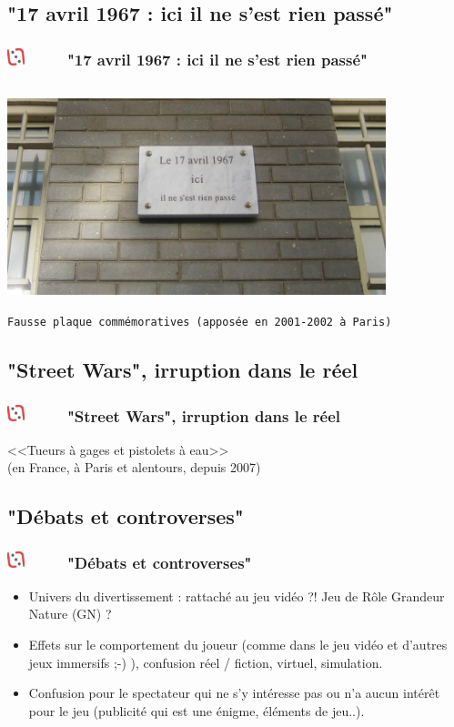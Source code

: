 \documentclass[slidetop,11pt]{beamer}
\def\moreInFrameTitleLeftt{\includegraphics[height=0.5cm]{img/ligueludique-0.png}~~~~~}
\begin{document}
\def\sectionPartIIIa{"17 avril 1967 : ici il ne s'est rien pass{\'e}"}
\subsection{\sectionPartIIIa}
\begin{frame}
	\frametitle{\moreInFrameTitleLeftt \sectionPartIIIa}
	\begin{center}
		\includegraphics[height=6.5cm,width=11.0cm]{img/84869389_o.png} ~\\ %
		\texttt{\footnotesize Fausse plaque comm{\'e}moratives (appos{\'e}e en 2001-2002 {\`a} Paris)}
	\end{center}
\end{frame}

\def\sectionPartIIIb{"Street Wars", irruption dans le r{\'e}el}
\subsection{\sectionPartIIIb}
\begin{frame}
	\frametitle{\moreInFrameTitleLeftt \sectionPartIIIb}
	\begin{center}
		<<Tueurs {\`a} gages et pistolets {\`a} eau>>~\\
		(en France, {\`a} Paris et alentours, depuis 2007)
	\end{center}
\end{frame}

\def\sectionPartIIId{"D{\'e}bats et controverses"}
\subsection{\sectionPartIIId}
\begin{frame}
	\frametitle{\moreInFrameTitleLeftt \sectionPartIIId}
	\begin{itemize}
		\item Univers du divertissement : rattach{\'e} au jeu vid{\'e}o ?! Jeu de R{\^o}le Grandeur Nature (GN) ?
		\item Effets sur le comportement du joueur (comme dans le jeu vid{\'e}o et d'autres jeux immersifs ;-) ), confusion r{\'e}el / fiction, virtuel, simulation. 
		\item Confusion pour le spectateur qui ne s'y int{\'e}resse pas ou n'a aucun int{\'e}r{\^e}t pour le jeu (publicit{\'e} qui est une {\'e}nigme, {\'e}l{\'e}ments de jeu..). 
	\end{itemize}
\end{frame}
\end{document}
